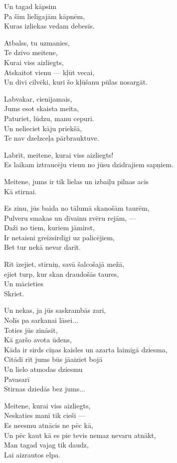 \documentclass[14pt]{extarticle}
\begin{document}
Un tagad kāpsim\\
Pa šīm lielīgajām kāpnēm,\\
Kuras izliekas vedam debesīs.

Atbalss, tu uzmanies,\\
Te dzīvo meitene,\\
Kurai viss aizliegts,\\
Atskaitot vienu --- kļūt vecai,\\
Un divi cilvēki, kuri šo kļūšanu pūlas nosargāt.

Labvakar, cienījamais,\\
Jums esot skaista meita,\\
Paturiet, lūdzu, manu cepuri.\\
Un nelieciet kāju priekšā,\\
Te nav dzelzceļa pārbrauktuve.

Labrīt, meitene, kurai viss aizliegts!\\
Es laikam iztraucēju vienu no jūsu dzidrajiem sapņiem.

Meitene, jums ir tik lielas un izbaiļu pilnas acis\\
Kā stirnai.

Es zinu, jūs baida no tālumā skanošām taurēm,\\
Pulveru smakas un dīvainu zvēru rejām, ---\\
Daži no tiem, kuriem jāmirst,\\
Ir netaisni greizsirdīgi uz palicējiem,\\
Bet tur nekā nevar darīt.

Rīt izejiet, stirniņ, savā šalcošajā mežā,\\
ejiet turp, kur skan draudošās taures,\\
Un mācieties\\
Skriet.

Un nekas, ja jūs saskrambās zari,\\
Nolīs pa sarkanai lāsei...\\
Toties jūs zināsit,\\
Kā garšo avota ūdens,\\
Kāda ir sirds cīņas kaisles un azarta laimīgā dziesma,\\
Citādi rīt jums būs jāaiziet bojā\\
Un lielo atmodas dziesmu\\
Pavasarī\\
Stirnas dziedās bez jums...

Meitene, kurai viss aizliegts,\\
Neskaties manī tik cieši ---\\
Es neesmu atnācis ne pēc kā,\\
Un pēc kaut kā es pie tevis nemaz nevaru atnākt,\\
Man tagad vajag tik daudz,\\
Lai aizrautos elpa.
\end{document}
